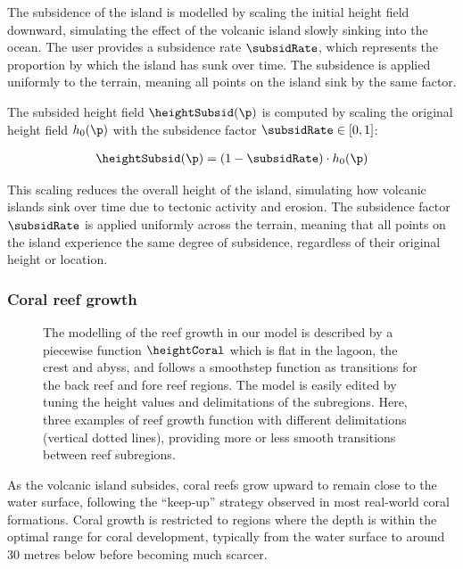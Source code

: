 The subsidence of the island is modelled by scaling the initial height field downward, simulating the effect of the volcanic island slowly sinking into the ocean. The user provides a subsidence rate $\subsidRate$, which represents the proportion by which the island has sunk over time. The subsidence is applied uniformly to the terrain, meaning all points on the island sink by the same factor.

The subsided height field $\heightSubsid(\p)$ is computed by scaling the original height field $h_0(\p)$ with the subsidence factor $\subsidRate \in [0, 1]$:

\begin{align}
\heightSubsid(\p) = (1 - \subsidRate) \cdot h_0(\p)
\end{align}

This scaling reduces the overall height of the island, simulating how volcanic islands sink over time due to tectonic activity and erosion. The subsidence factor $\subsidRate$ is applied uniformly across the terrain, meaning that all points on the island experience the same degree of subsidence, regardless of their original height or location.

\subsubsection{Coral reef growth}
\label{sec:coral-island-reef-growth}

\begin{figure}[H]
\caption{The modelling of the reef growth in our model is described by a piecewise function $\heightCoral$ which is flat in the lagoon, the crest and abyss, and follows a smoothstep function as transitions for the back reef and fore reef regions. The model is easily edited by tuning the height values and delimitations of the subregions. Here, three examples of reef growth function with different delimitations (vertical dotted lines), providing more or less smooth transitions between reef subregions.}
\label{fig:coral-island-reef-function}
\end{figure}

As the volcanic island subsides, coral reefs grow upward to remain close to the water surface, following the “keep-up” strategy observed in most real-world coral formations. Coral growth is restricted to regions where the depth is within the optimal range for coral development, typically from the water surface to around 30 metres below before becoming much scarcer.


